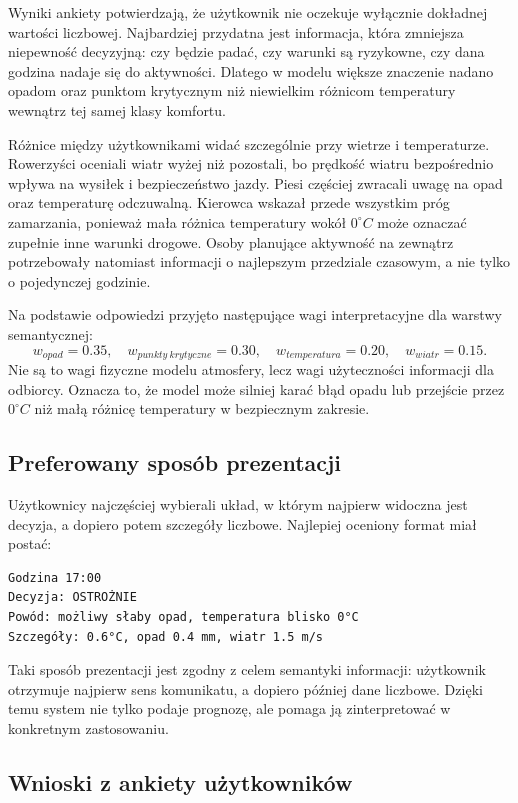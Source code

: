 \documentclass[a4paper,12pt]{article}
\begin{document}
\noindent
Wyniki ankiety potwierdzają, że użytkownik nie oczekuje wyłącznie dokładnej
wartości liczbowej. Najbardziej przydatna jest informacja, która zmniejsza
niepewność decyzyjną: czy będzie padać, czy warunki są ryzykowne, czy dana
godzina nadaje się do aktywności. Dlatego w modelu większe znaczenie nadano
opadom oraz punktom krytycznym niż niewielkim różnicom temperatury wewnątrz
tej samej klasy komfortu.

\noindent
Różnice między użytkownikami widać szczególnie przy wietrze i temperaturze.
Rowerzyści oceniali wiatr wyżej niż pozostali, bo prędkość wiatru bezpośrednio
wpływa na wysiłek i bezpieczeństwo jazdy. Piesi częściej zwracali uwagę na
opad oraz temperaturę odczuwalną. Kierowca wskazał przede wszystkim próg
zamarzania, ponieważ mała różnica temperatury wokół \(0^\circ C\) może oznaczać
zupełnie inne warunki drogowe. Osoby planujące aktywność na zewnątrz
potrzebowały natomiast informacji o najlepszym przedziale czasowym, a nie tylko
o pojedynczej godzinie.

\noindent
Na podstawie odpowiedzi przyjęto następujące wagi interpretacyjne dla warstwy
semantycznej:
\[
w_{opad}=0.35,\quad
w_{punkty\ krytyczne}=0.30,\quad
w_{temperatura}=0.20,\quad
w_{wiatr}=0.15.
\]
Nie są to wagi fizyczne modelu atmosfery, lecz wagi użyteczności informacji dla
odbiorcy. Oznacza to, że model może silniej karać błąd opadu lub przejście
przez \(0^\circ C\) niż małą różnicę temperatury w bezpiecznym zakresie.

\subsection{Preferowany sposób prezentacji}

Użytkownicy najczęściej wybierali układ, w którym najpierw widoczna jest
decyzja, a dopiero potem szczegóły liczbowe. Najlepiej oceniony format miał
postać:
\begin{verbatim}
Godzina 17:00
Decyzja: OSTROŻNIE
Powód: możliwy słaby opad, temperatura blisko 0°C
Szczegóły: 0.6°C, opad 0.4 mm, wiatr 1.5 m/s
\end{verbatim}

\noindent
Taki sposób prezentacji jest zgodny z celem semantyki informacji: użytkownik
otrzymuje najpierw sens komunikatu, a dopiero później dane liczbowe. Dzięki
temu system nie tylko podaje prognozę, ale pomaga ją zinterpretować w
konkretnym zastosowaniu.

\subsection{Wnioski z ankiety użytkowników}
\end{document}
